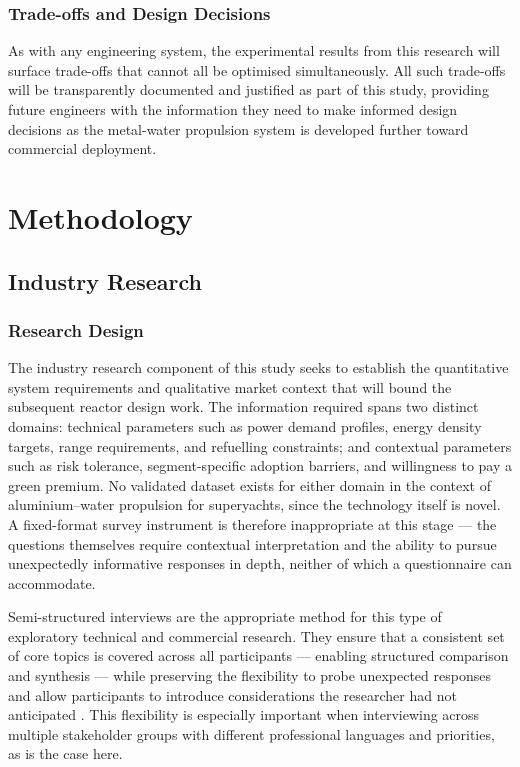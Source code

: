 \documentclass[12pt]{article}
\begin{document}
\subsubsection*{Trade-offs and Design Decisions}

As with any engineering system, the experimental results from this research will 
surface trade-offs that cannot all be optimised simultaneously. All such trade-offs 
will be transparently documented and justified as part of this study, providing 
future engineers with the information they need to make informed design decisions 
as the metal-water propulsion system is developed further toward commercial 
deployment.

\break

\section{Methodology}

\subsection{Industry Research}
\label{sec:industry-research}

\subsubsection*{Research Design}

The industry research component of this study seeks to establish the quantitative 
system requirements and qualitative market context that will bound the subsequent 
reactor design work. The information required spans two distinct domains: technical 
parameters such as power demand profiles, energy density targets, range requirements, 
and refuelling constraints; and contextual parameters such as risk tolerance, 
segment-specific adoption barriers, and willingness to pay a green premium. No 
validated dataset exists for either domain in the context of aluminium--water 
propulsion for superyachts, since the technology itself is novel. A fixed-format 
survey instrument is therefore inappropriate at this stage --- the questions 
themselves require contextual interpretation and the ability to pursue unexpectedly 
informative responses in depth, neither of which a questionnaire can accommodate.

Semi-structured interviews are the appropriate method for this type of exploratory 
technical and commercial research. They ensure that a consistent set of core topics 
is covered across all participants --- enabling structured comparison and synthesis 
--- while preserving the flexibility to probe unexpected responses and allow 
participants to introduce considerations the researcher had not anticipated 
\cite{kvale2009}. This flexibility is especially important when interviewing across 
multiple stakeholder groups with different professional languages and priorities, as 
is the case here.
\end{document}
